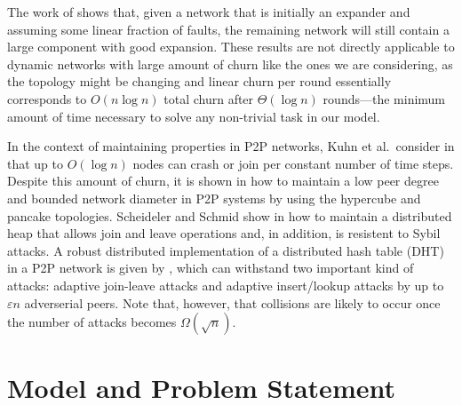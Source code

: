 \documentclass[leqno,11pt]{article}
\newcommand{\eps}{\varepsilon}
\begin{document}
The work of \cite{BBCES2006} shows that, given a network that is initially
an expander and assuming some linear fraction of faults, the remaining
network will still contain a large component with good expansion.  These
results are not directly applicable to dynamic networks with large amount
of churn like the ones we are considering, as the topology might be
changing and linear churn per round essentially corresponds to
$O(n\log n)$ total churn after $\Theta(\log n)$ rounds---the minimum amount
of time necessary to solve any non-trivial task in our model.

In the context of maintaining properties in P2P networks, Kuhn et al.\
consider in \cite{KSW10} that up to $O(\log n)$ nodes can crash or join per constant number of time
steps. Despite this amount of churn, it is shown in \cite{KSW10} how to maintain a low peer
degree and bounded network diameter in P2P systems by using the hypercube and
pancake topologies.  Scheideler and Schmid show in \cite{SS09} how to maintain a
distributed heap that allows join and leave operations and, in addition, is
resistent to Sybil attacks. A robust distributed implementation of a distributed
hash table (DHT) in a P2P network is given by \cite{AS09}, which can withstand
two important kind of attacks: adaptive join-leave attacks and adaptive
insert/lookup attacks by up to $\eps n$ adverserial peers. 
Note that, however, that collisions are likely to occur once the number of attacks becomes $\Omega(\sqrt{n})$.




\section{Model and Problem Statement} \label{sec:model}
\end{document}
